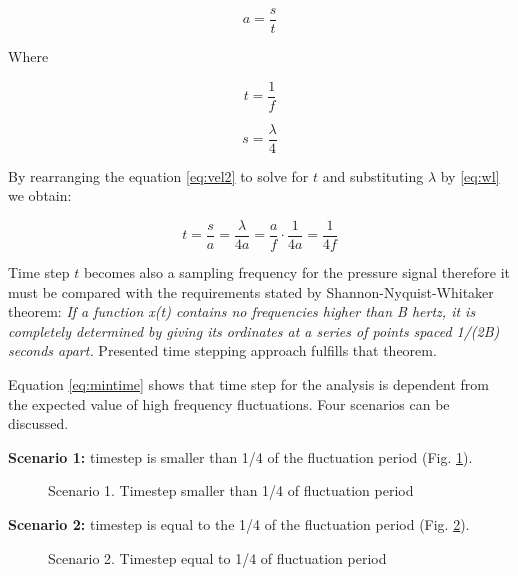 \begin{equation} \label{eq:vel2}
a = \frac{s}{t}
\end{equation}

Where

\begin{equation} \label{eq:time}
t = \frac{1}{f}
\end{equation}

\begin{equation} \label{eq:dist}
s = \frac{\lambda}{4}
\end{equation}

By rearranging the equation \ref{eq:vel2} to solve for $t$ and substituting $\lambda$ by \ref{eq:wl} we obtain:

\begin{equation} \label{eq:mintime}
t = \frac{s}{a} = \frac{\lambda}{4a} = \frac{a}{f} \cdot \frac{1}{4a} = \frac{1}{4f}
\end{equation}

Time step $t$ becomes also a sampling frequency for the pressure signal therefore it must be compared with the requirements stated by Shannon-Nyquist-Whitaker theorem: \textit{If a function x(t) contains no frequencies higher than B hertz, it is completely determined by giving its ordinates at a series of points spaced 1/(2B) seconds apart.} Presented time stepping approach fulfills that theorem.

Equation \ref{eq:mintime} shows that time step for the analysis is dependent from the expected value of high frequency fluctuations. Four scenarios can be discussed.

\textbf{Scenario 1:} timestep is smaller than 1/4 of the fluctuation period (Fig. \ref{time1}).

\begin{figure}[h!]
\centering %
\caption{Scenario 1. Timestep smaller than 1/4 of fluctuation period}
\label{time1}
\end{figure}

\textbf{Scenario 2:} timestep is equal to the  1/4 of the fluctuation period (Fig. \ref{time2}).

\begin{figure}[h!]
\centering %
\caption{Scenario 2. Timestep equal to 1/4 of fluctuation period}
\label{time2}
\end{figure}

